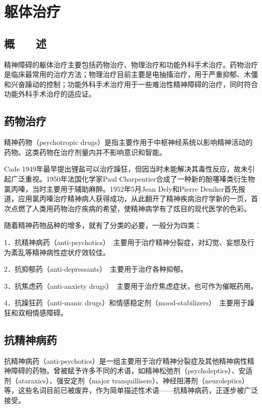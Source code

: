 \chapter{躯体治疗}

\section{概　　述}

精神障碍的躯体治疗主要包括药物治疗、物理治疗和功能外科手术治疗。药物治疗是临床最常用的治疗方法；物理治疗目前主要是电抽搐治疗，用于严重抑郁、木僵和兴奋躁动的控制；功能外科手术治疗用于一些难治性精神障碍的治疗，同时符合功能外科手术治疗的适应证。

\section{药物治疗}

精神药物（psychotropic
drugs）是指主要作用于中枢神经系统以影响精神活动的药物。这类药物在治疗剂量内并不影响意识和智能。

Cade
1949年最早提出锂盐可以治疗躁狂，但因当时未能解决其毒性反应，故未引起广泛重视。1950年法国化学家Paul
Charpentier合成了一种新的酚噻嗪类衍生物氯丙嗪，当时主要用于辅助麻醉。1952年5月Jean
Dely和Pierre
Deniker首先报道，应用氯丙嗪治疗精神病人获得成功，从此翻开了精神疾病治疗学新的一页，首次点燃了人类用药物治疗疾病的希望，使精神病学有了炫目的现代医学的色彩。

随着精神药物品种的增多，就有了分类的必要，一般分为四类：

1．抗精神病药（anti-psychotics）　主要用于治疗精神分裂症，对幻觉、妄想及行为紊乱等精神病性症状疗效较佳。

2．抗抑郁药（anti-depressants）　主要用于治疗各种抑郁。

3．抗焦虑药（anti-anxiety
drugs）　主要用于治疗焦虑症状，也可作为催眠药用。

4．抗躁狂药（anti-manic
drugs）和情感稳定剂（mood-stabilizers）　主要用于躁狂和双相情感障碍。

\section{抗精神病药}

抗精神病药（anti-psychotics）是一组主要用于治疗精神分裂症及其他精神病性精神障碍的药物。曾被赋予许多不同的术语，如精神松弛剂（psycholeptics）、安适剂（ataraxics）、强安定剂（major
tranquillisers）、神经阻滞剂（neuroleptics）等，这些名词目前已被废弃，作为简单描述性术语------抗精神病药，正逐步被广泛接受。

